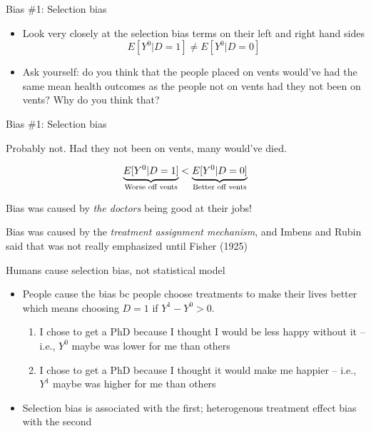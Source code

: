 \documentclass{beamer}
\begin{document}
\begin{frame}{Bias \#1: Selection bias}

  \begin{itemize}
    \item Look very closely at the selection bias terms on their left and right hand sides $$E[Y^0|D=1] \neq E[Y^0 |D=0]$$
    \item Ask yourself: do you think that the people placed on vents would've had the same mean health outcomes as the people not on vents had they not been on vents? Why do you think that?
      \end{itemize}

\end{frame}

\begin{frame}{Bias \#1: Selection bias}

Probably not. Had they not been on vents, many would've died.

\bigskip

  $$\underbrace{E[Y^0|D=1]}_{\mathclap{\text{Worse off vents}}} < \underbrace{E[Y^0|D=0]}_{\mathclap{\text{Better off vents}}}$$

\bigskip

Bias was caused by \emph{the doctors} being good at their jobs!  

\bigskip

Bias was caused by the \emph{treatment assignment mechanism}, and Imbens and Rubin said that was not really emphasized until Fisher (1925) 


\end{frame}




\begin{frame}{Humans cause selection bias, not statistical model}

\begin{itemize}
\item People cause the bias bc people choose treatments to make their lives better which means choosing $D=1$ if $Y^1-Y^0>0$.
	\begin{enumerate}
	\item I chose to get a PhD because I thought I would be less happy without it -- i.e., $Y^0$ maybe was lower for me than others
	\item I chose to get a PhD because I thought it would make me happier -- i.e., $Y^1$ maybe was higher for me than others
	\end{enumerate}
\item Selection bias is associated with the first; heterogenous treatment effect bias with the second
\end{itemize}

\end{frame}
\end{document}
